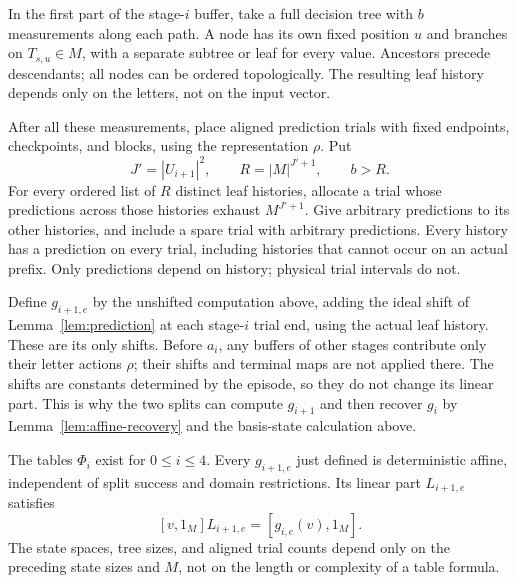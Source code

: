 In the first part of the stage-$i$ buffer, take a full decision tree
with $b$ measurements along each path. A node has its own fixed
position $u$ and branches on $T_{s,u}\in M$, with a separate subtree
or leaf for every value. Ancestors precede descendants; all nodes
can be ordered topologically. The resulting leaf history depends
only on the letters, not on the input vector.

After all these measurements, place aligned prediction trials with
fixed endpoints, checkpoints, and blocks, using the representation
$\rho$. Put
\[
              J'=|U_{i+1}|^2,\qquad
              R=|M|^{J'+1},\qquad b>R.
\]
For every ordered list of $R$ distinct leaf histories, allocate a trial
whose predictions across those histories exhaust $M^{J'+1}$. Give
arbitrary predictions to its other histories, and include a spare
trial with arbitrary predictions. Every history has a prediction on
every trial, including histories that cannot occur on an actual prefix.
Only predictions depend on history; physical trial intervals do not.

Define $g_{i+1,e}$ by the unshifted computation above, adding the ideal
shift of Lemma~\ref{lem:prediction} at each stage-$i$ trial end, using
the actual leaf history. These are its only shifts. Before $a_i$,
any buffers of other stages contribute only their letter actions
$\rho$; their shifts and terminal maps are not applied there. The
shifts are constants determined by the episode, so they do not change
its linear part. This is why the two splits can compute $g_{i+1}$
and then recover $g_i$ by Lemma~\ref{lem:affine-recovery} and the
basis-state calculation above.

\begin{lemma}\label{lem:total-tables}
The tables $\Phi_i$ exist for $0\le i\le4$.
Every $g_{i+1,e}$ just defined is deterministic affine, independent of
split success and domain restrictions. Its linear part $L_{i+1,e}$
satisfies
\begin{equation}\label{eq:basis-recovery}
                 [v,1_M]L_{i+1,e}=[g_{i,e}(v),1_M].
\end{equation}
The state spaces, tree sizes, and aligned trial counts depend only on
the preceding state sizes and $M$, not on the length or complexity of
a table formula.
\end{lemma}

